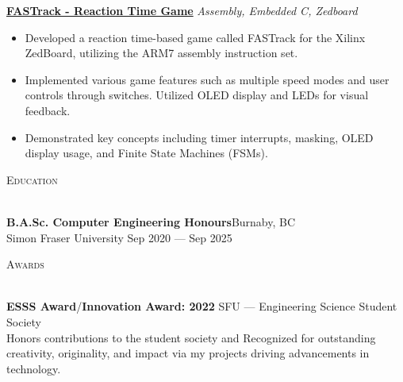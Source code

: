 \documentclass[a4paper]{article}
\newcommand{\lineunder} {
    \vspace*{-8pt} \\
    \hspace*{-18pt} \hrulefill\\
}
\newcommand{\header} [1] {
    {\hspace*{-18pt}\vspace*{6pt} \textsc{#1}}
    \vspace*{-6pt} \lineunder{}
}
\begin{document}
\href{https://github.com/SatireSage/FASTrack}{\textbf{FASTrack - Reaction Time Game}} {\sl Assembly, Embedded C, Zedboard\/}
\vspace{-2mm}
\begin{itemize} \itemsep-3pt
    \item Developed a reaction time-based game called FASTrack for the Xilinx ZedBoard, utilizing the ARM7 assembly instruction set.
    \item Implemented various game features such as multiple speed modes and user controls through switches. Utilized OLED display and LEDs for visual feedback.
    \item Demonstrated key concepts including timer interrupts, masking, OLED display usage, and Finite State Machines (FSMs).
\end{itemize}

\header{Education}
\textbf{B.A.Sc. Computer Engineering Honours}\hfill Burnaby, BC\\
Simon Fraser University \hfill Sep 2020 --- Sep 2025\\
\vspace{1mm}

\header{Awards}
\textbf{ESSS Award}/\textbf{Innovation Award: 2022} \hfill SFU --- Engineering Science Student Society\\
Honors contributions to the student society and Recognized for outstanding creativity, originality, and impact via my projects driving advancements in technology.\\
\vspace*{1mm}
\end{document}
